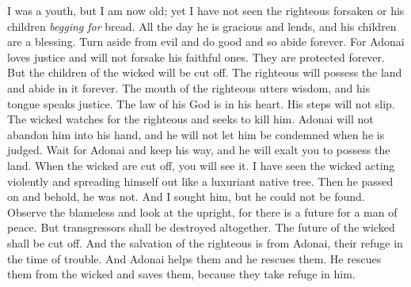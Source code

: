 \begin{biblechapter}
\verse I was a youth, but I am now old; 
yet I have not seen the righteous forsaken 
or his children \textit{begging for} bread.
\verse All the day he is gracious and lends, 
and his children are a blessing.
\verse Turn aside from evil and do good 
and so abide forever.
\verse For Adonai loves justice 
and will not forsake his faithful ones. 
They are protected forever. 
But the children of the wicked will be cut off.
\verse The righteous will possess the land 
and abide in it forever.
\verse The mouth of the righteous utters wisdom, 
and his tongue speaks justice.
\verse The law of his God is in his heart. 
His steps will not slip.
\verse The wicked watches for the righteous 
and seeks to kill him.
\verse Adonai will not abandon him into his hand, 
and he will not let him be condemned when he is judged.
\verse Wait for Adonai and keep his way, 
and he will exalt you to possess the land. 
When the wicked are cut off, you will see it.
\verse I have seen the wicked acting violently 
and spreading himself out 
like a luxuriant native tree.
\verse Then he passed on and behold, he was not. 
And I sought him, but he could not be found.
\verse Observe the blameless and look at the upright, 
for there is a future for a man of peace.
\verse But transgressors shall be destroyed altogether. 
The future of the wicked shall be cut off.
\verse And the salvation of the righteous is from Adonai, 
their refuge in the time of trouble.
\verse And Adonai helps them and he rescues them. 
He rescues them from the wicked and saves them, 
because they take refuge in him.
\end{biblechapter}

